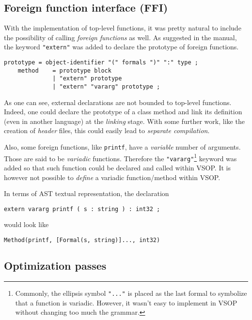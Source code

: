 \documentclass[a4paper, 12pt]{article}
\begin{document}
	\subsection{Foreign function interface (FFI)}
	
	With the implementation of top-level functions, it was pretty natural to include the possibility of calling \emph{foreign functions} as well. As suggested in the manual, the keyword \lstinline[style=vsop]{"extern"} was added to declare the prototype of foreign functions.
	
	\begin{lstlisting}[style=vsop]
	prototype = object-identifier "(" formals ")" ":" type ;
    method    = prototype block
              | "extern" prototype
              | "extern" "vararg" prototype ;
	\end{lstlisting}
	
	As one can see, external declarations are not bounded to top-level functions. Indeed, one could declare the prototype of a class method and link its definition (even in another language) at the \emph{linking} stage. With some further work, like the creation of \emph{header} files, this could easily lead to \emph{separate compilation}.
	
	Also, some foreign functions, like \texttt{printf}, have a \emph{variable} number of arguments. Those are said to be \emph{variadic} functions. Therefore the \lstinline[style=vsop]{"vararg"}\footnote{Commonly, the ellipsis symbol \lstinline[style=vsop]{"..."} is placed as the last formal to symbolize that a function is variadic. However, it wasn't easy to implement in VSOP without changing too much the grammar. } keyword was added so that such function could be declared and called within VSOP. It is however not possible to \emph{define} a variadic function/method within VSOP.
	
	In terms of AST textual representation, the declaration
	
	\begin{lstlisting}[style=vsop]
	extern vararg printf ( s : string ) : int32 ;
	\end{lstlisting}
	
	would look like
	
	\begin{lstlisting}[style=vsop]
	Method(printf, [Formal(s, string)]..., int32)
	\end{lstlisting}
	
	\subsection{Optimization passes}
	
\end{document}
